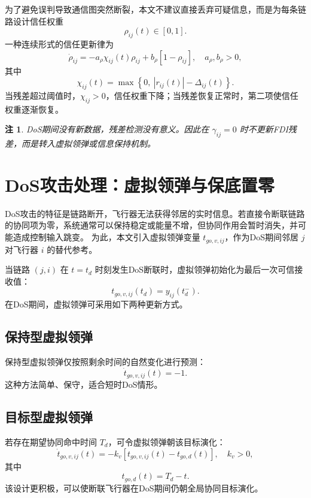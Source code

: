 \documentclass[UTF8,a4paper,11pt]{ctexart}
\newtheorem{remark}{注}
\begin{document}
为了避免误判导致通信图突然断裂，本文不建议直接丢弃可疑信息，而是为每条链路设计信任权重
\[
\rho_{ij}(t)\in[0,1].
\]
一种连续形式的信任更新律为
\begin{equation}
\dot\rho_{ij}
=
-a_\rho \chi_{ij}(t)\rho_{ij}
+b_\rho[1-\rho_{ij}],
\quad
a_\rho,b_\rho>0,
\label{eq:trust_update}
\end{equation}
其中
\begin{equation}
\chi_{ij}(t)
=
\max\left\{0,\ |r_{ij}(t)|-\Delta_{ij}(t)\right\}.
\label{eq:residual_excess}
\end{equation}
当残差超过阈值时，$\chi_{ij}>0$，信任权重下降；当残差恢复正常时，第二项使信任权重逐渐恢复。

\begin{remark}
DoS期间没有新数据，残差检测没有意义。因此在 $\gamma_{ij}=0$ 时不更新FDI残差，而是转入虚拟领弹或信息保持机制。
\end{remark}

\section{DoS攻击处理：虚拟领弹与保底置零}

DoS攻击的特征是链路断开，飞行器无法获得邻居的实时信息。若直接令断联链路的协同项为零，系统通常可以保持稳定或能量不增，但协同作用会暂时消失，并可能造成控制输入跳变。
为此，本文引入虚拟领弹变量 $t_{go,v,ij}$，作为DoS期间邻居 $j$ 对飞行器 $i$ 的替代参考。

当链路 $(j,i)$ 在 $t=t_d$ 时刻发生DoS断联时，虚拟领弹初始化为最后一次可信接收值：
\begin{equation}
t_{go,v,ij}(t_d)=y_{ij}(t_d^-).
\label{eq:virtual_initial}
\end{equation}
在DoS期间，虚拟领弹可采用如下两种更新方式。

\subsection{保持型虚拟领弹}

保持型虚拟领弹仅按照剩余时间的自然变化进行预测：
\begin{equation}
\dot t_{go,v,ij}(t)=-1.
\label{eq:virtual_hold}
\end{equation}
这种方法简单、保守，适合短时DoS情形。

\subsection{目标型虚拟领弹}

若存在期望协同命中时间 $T_d$，可令虚拟领弹朝该目标演化：
\begin{equation}
\dot t_{go,v,ij}(t)
=
-k_v\left[t_{go,v,ij}(t)-t_{go,d}(t)\right],
\quad k_v>0,
\label{eq:virtual_target}
\end{equation}
其中
\[
t_{go,d}(t)=T_d-t.
\]
该设计更积极，可以使断联飞行器在DoS期间仍朝全局协同目标演化。
\end{document}
